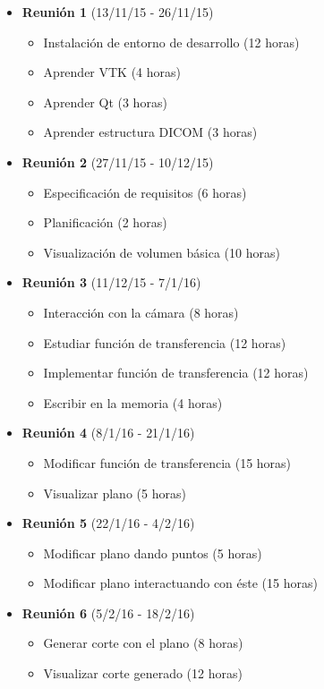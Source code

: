 \begin{itemize}
	\item \textbf{Reunión 1} (13/11/15 - 26/11/15)
	\begin{itemize}
		\item Instalación de entorno de desarrollo (12 horas)
		\item Aprender VTK (4 horas)
		\item Aprender Qt (3 horas)
		\item Aprender estructura DICOM (3 horas)
	\end{itemize}
	
	\item \textbf{Reunión 2} (27/11/15 - 10/12/15)
	\begin{itemize}
		\item Especificación de requisitos (6 horas)
		\item Planificación (2 horas)
		\item Visualización de volumen básica (10 horas)
	\end{itemize}
	
	\item \textbf{Reunión 3} (11/12/15 - 7/1/16)
	\begin{itemize}
		\item Interacción con la cámara (8 horas)
		\item Estudiar función de transferencia (12 horas)
		\item Implementar función de transferencia (12 horas)
		\item Escribir en la memoria (4 horas)
	\end{itemize}
	
	\item \textbf{Reunión 4} (8/1/16 - 21/1/16)
	\begin{itemize}
		\item Modificar función de transferencia (15 horas)
		\item Visualizar plano (5 horas)
	\end{itemize}
	
	\item \textbf{Reunión 5} (22/1/16 - 4/2/16)
	\begin{itemize}
		\item Modificar plano dando puntos (5 horas)
		\item Modificar plano interactuando con éste (15 horas)
	\end{itemize}
	
	\item \textbf{Reunión 6} (5/2/16 - 18/2/16)
	\begin{itemize}
		\item Generar corte con el plano (8 horas)
		\item Visualizar corte generado (12 horas)
	\end{itemize}
	

\end{itemize}
